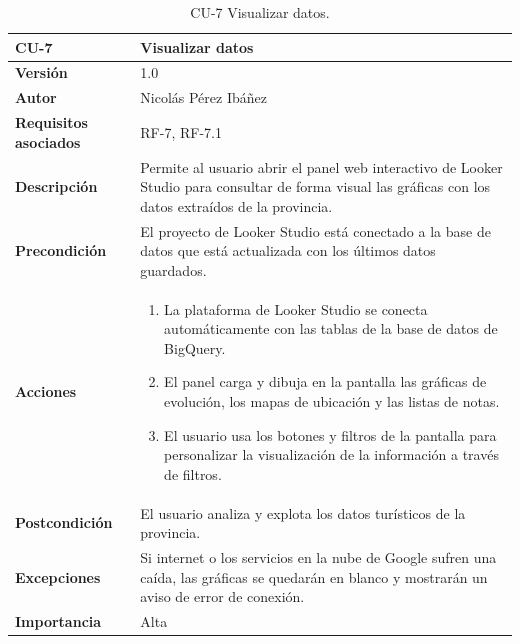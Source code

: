 \begin{table}[p]
	\centering
	\begin{tabularx}{\linewidth}{ p{} p{} }
		\toprule
		\textbf{CU-7}    & \textbf{Visualizar datos}\\
		\toprule
		\textbf{Versión}              & 1.0    \\
		\textbf{Autor}                & Nicolás Pérez Ibáñez \\
		\textbf{Requisitos asociados} & RF-7, RF-7.1 \\
		\textbf{Descripción}          & Permite al usuario abrir el panel web interactivo de Looker Studio para consultar de forma visual las gráficas con los datos extraídos de la provincia. \\
		\textbf{Precondición}         & El proyecto de Looker Studio está conectado a la base de datos que está actualizada con los últimos datos guardados. \\
		\textbf{Acciones}             &
		\begin{enumerate}
			\def\labelenumi{\arabic{enumi}.}
			\tightlist
			\item La plataforma de Looker Studio se conecta automáticamente con las tablas de la base de datos de BigQuery.
			\item El panel carga y dibuja en la pantalla las gráficas de evolución, los mapas de ubicación y las listas de notas.
			\item El usuario usa los botones y filtros de la pantalla para personalizar la visualización de la información a través de filtros.
		\end{enumerate}\\
		\textbf{Postcondición}        & El usuario analiza y explota los datos turísticos de la provincia. \\
		\textbf{Excepciones}          & Si internet o los servicios en la nube de Google sufren una caída, las gráficas se quedarán en blanco y mostrarán un aviso de error de conexión. \\
		\textbf{Importancia}          & Alta \\
		\bottomrule
	\end{tabularx}
	\caption{CU-7 Visualizar datos.}
\end{table}